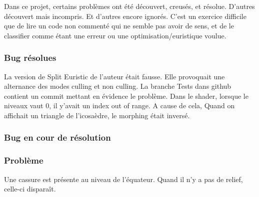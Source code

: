 
 Dans ce projet, certains problèmes ont été découvert, creusés, et résolue. D'autres découvert mais incompris. Et d'autres encore ignorés. C'est un exercice difficile que de lire un code non commenté qui ne semble pas avoir de sens, et de le classifier comme étant une erreur ou une optimisation/euristique voulue.
\subsubsection{Bug résolues}
La version de Split Euristic de l'auteur était fausse. Elle provoquait une alternance des modes culling et non culling. La branche Tests dans github contient un commit mettant en évidence le problème.
Dans le shader, lorsque le niveaux vaut 0, il y'avait un index out of range. A cause de cela, Quand on affichait un triangle de l'icosaèdre, le morphing était inversé.

\subsubsection{Bug en cour de résolution}

\subsubsection{Problème}
Une cassure est présente au niveau de l'équateur. Quand il n'y a pas de relief, celle-ci disparaît.